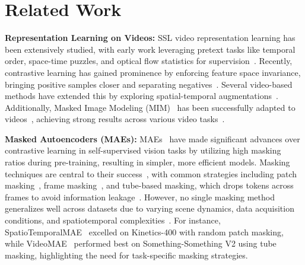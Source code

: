 \section{Related Work}
\label{sec:related}

\noindent \textbf{Representation Learning on Videos:}
SSL video representation learning has been extensively studied, with early work leveraging pretext tasks like temporal order, space-time puzzles, and optical flow statistics for supervision~\cite{benaim2020speednet,misra2016shuffle,wang2015unsupervised,xu2019self}. Recently, contrastive learning has gained prominence by enforcing feature space invariance, bringing positive samples closer and separating negatives~\cite{chen2020simple,he2020momentum,li2021improve}. Several video-based methods have extended this by exploring spatial-temporal augmentations~\cite{diba2021vi2clr,feichtenhofer2021large,ge2021revitalizing,han2020memory,pan2021videomoco,qian2021spatiotemporal}. Additionally, Masked Image Modeling (MIM)~\cite{bao2022beit,he2022masked,feichtenhofer2022masked,wei2022masked} has been successfully adapted to videos~\cite{feichtenhofer2022masked,tong2022videomae,wei2022masked}, achieving strong results across various video tasks~\cite{simonyan2014two,tran2015learning,wang2018temporal,wang2021tdn,zhang2021co}.

\noindent \textbf{Masked Autoencoders (MAEs):}
MAEs~\cite{bandara2023adamae,feichtenhofer2022masked,huang2023mgmae,tong2022videomae,wang2023videomae} have made significant advances over contrastive learning in self-supervised vision tasks by utilizing high masking ratios during pre-training, resulting in simpler, more efficient models. Masking techniques are central to their success~\cite{feichtenhofer2022masked,tong2022videomae}, with common strategies including patch masking~\cite{feichtenhofer2022masked}, frame masking~\cite{qian2021spatiotemporal,wei2022masked}, and tube-based masking, which drops tokens across frames to avoid information leakage~\cite{wang2023videomae}. However, no single masking method generalizes well across datasets due to varying scene dynamics, data acquisition conditions, and spatiotemporal complexities~\cite{bandara2023adamae}. For instance, SpatioTemporalMAE~\cite{feichtenhofer2022masked} excelled on Kinetics-400 with random patch masking, while VideoMAE~\cite{tong2022videomae} performed best on Something-Something V2 using tube masking, highlighting the need for task-specific masking strategies.

